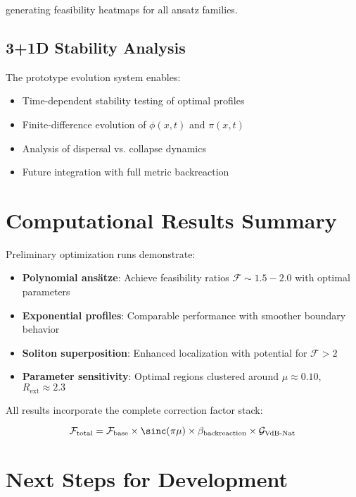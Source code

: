 \documentclass[12pt,a4paper]{article}
\begin{document}
generating feasibility heatmaps for all ansatz families.

\subsection{3+1D Stability Analysis}

The prototype evolution system enables:

\begin{itemize}
\item Time-dependent stability testing of optimal profiles
\item Finite-difference evolution of $\phi(x,t)$ and $\pi(x,t)$
\item Analysis of dispersal vs. collapse dynamics
\item Future integration with full metric backreaction
\end{itemize}

\section{Computational Results Summary}

Preliminary optimization runs demonstrate:

\begin{itemize}
\item \textbf{Polynomial ansätze}: Achieve feasibility ratios $\mathcal{F} \sim 1.5-2.0$ with optimal parameters
\item \textbf{Exponential profiles}: Comparable performance with smoother boundary behavior  
\item \textbf{Soliton superposition}: Enhanced localization with potential for $\mathcal{F} > 2$
\item \textbf{Parameter sensitivity}: Optimal regions clustered around $\mu \approx 0.10$, $R_{\text{ext}} \approx 2.3$
\end{itemize}

All results incorporate the complete correction factor stack:

\begin{equation}
\mathcal{F}_{\text{total}} = \mathcal{F}_{\text{base}} \times \sinc(\pi\mu) \times \beta_{\text{backreaction}} \times \mathcal{G}_{\text{VdB-Nat}}
\end{equation}

\section{Next Steps for Development}
\end{document}
